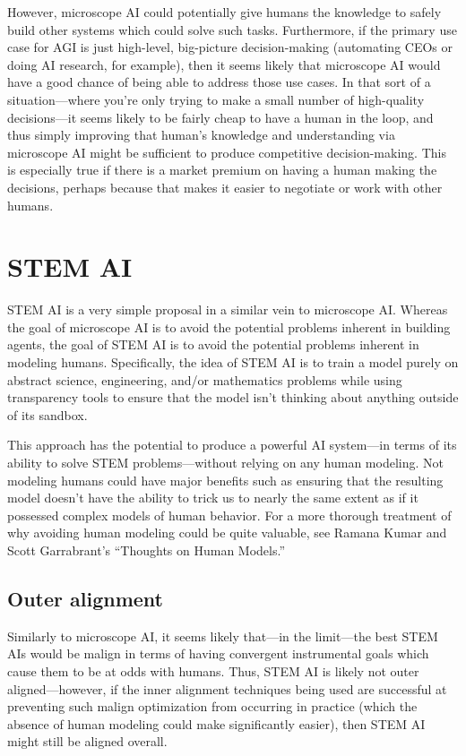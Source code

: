 \documentclass[
  onecolumn,
  natbib,
]{miri-tech-article}
\begin{document}
However, microscope AI could potentially give humans the knowledge to safely build other systems which could solve such tasks. Furthermore, if the primary use case for AGI is just high-level, big-picture decision-making (automating CEOs or doing AI research, for example), then it seems likely that microscope AI would have a good chance of being able to address those use cases. In that sort of a situation---where you're only trying to make a small number of high-quality decisions---it seems likely to be fairly cheap to have a human in the loop, and thus simply improving that human's knowledge and understanding via microscope AI might be sufficient to produce competitive decision-making. This is especially true if there is a market premium on having a human making the decisions, perhaps because that makes it easier to negotiate or work with other humans.

\section{STEM AI}
\label{sec:6}

STEM AI is a very simple proposal in a similar vein to microscope AI. Whereas the goal of microscope AI is to avoid the potential problems inherent in building agents, the goal of STEM AI is to avoid the potential problems inherent in modeling humans. Specifically, the idea of STEM AI is to train a model purely on abstract science, engineering, and/or mathematics problems while using transparency tools to ensure that the model isn't thinking about anything outside of its sandbox.

This approach has the potential to produce a powerful AI system---in terms of its ability to solve STEM problems---without relying on any human modeling. Not modeling humans could have major benefits such as ensuring that the resulting model doesn't have the ability to trick us to nearly the same extent as if it possessed complex models of human behavior. For a more thorough treatment of why avoiding human modeling could be quite valuable, see Ramana Kumar and Scott Garrabrant's ``Thoughts on Human Models.''\cite{human_models}

\subsection{Outer alignment} Similarly to microscope AI, it seems likely that---in the limit---the best STEM AIs would be malign in terms of having convergent instrumental goals which cause them to be at odds with humans. Thus, STEM AI is likely not outer aligned---however, if the inner alignment techniques being used are successful at preventing such malign optimization from occurring in practice (which the absence of human modeling could make significantly easier), then STEM AI might still be aligned overall.
\end{document}

